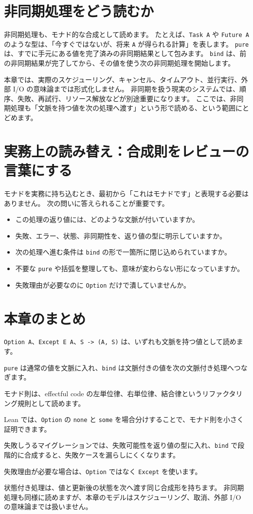\section{非同期処理をどう読むか}

非同期処理も、モナド的な合成として読めます。
たとえば、\texttt{Task A} や \texttt{Future A} のような型は、「今すぐではないが、将来 \texttt{A} が得られる計算」を表します。
\texttt{pure} は、すでに手元にある値を完了済みの非同期結果として包みます。
\texttt{bind} は、前の非同期結果が完了してから、その値を使う次の非同期処理を開始します。

本章では、実際のスケジューリング、キャンセル、タイムアウト、並行実行、外部 I/O の意味論までは形式化しません。
非同期を扱う現実のシステムでは、順序、失敗、再試行、リソース解放などが別途重要になります。
ここでは、非同期処理も「文脈を持つ値を次の処理へ渡す」という形で読める、という範囲にとどめます。

\section{実務上の読み替え：合成則をレビューの言葉にする}

モナドを実務に持ち込むとき、最初から「これはモナドです」と表現する必要はありません。
次の問いに答えられることが重要です。

\begin{itemize}
\item この処理の返り値には、どのような文脈が付いていますか。
\item 失敗、エラー、状態、非同期性を、返り値の型に明示していますか。
\item 次の処理へ進む条件は \texttt{bind} の形で一箇所に閉じ込められていますか。
\item 不要な \texttt{pure} や括弧を整理しても、意味が変わらない形になっていますか。
\item 失敗理由が必要なのに \texttt{Option} だけで潰していませんか。
\end{itemize}

\section{本章のまとめ}

\texttt{Option A}、\texttt{Except E A}、\texttt{S -> (A, S)} は、いずれも文脈を持つ値として読めます。

\texttt{pure} は通常の値を文脈に入れ、\texttt{bind} は文脈付きの値を次の文脈付き処理へつなぎます。

モナド則は、effectful code の左単位律、右単位律、結合律というリファクタリング規則として読めます。

Lean では、\texttt{Option} の \texttt{none} と \texttt{some} を場合分けすることで、モナド則を小さく証明できます。

失敗しうるマイグレーションでは、失敗可能性を返り値の型に入れ、\texttt{bind} で段階的に合成すると、失敗ケースを漏らしにくくなります。

失敗理由が必要な場合は、\texttt{Option} ではなく \texttt{Except} を使います。

状態付き処理は、値と更新後の状態を次へ渡す同じ合成形を持ちます。
非同期処理も同様に読めますが、本章のモデルはスケジューリング、取消、外部 I/O の意味論までは扱いません。
